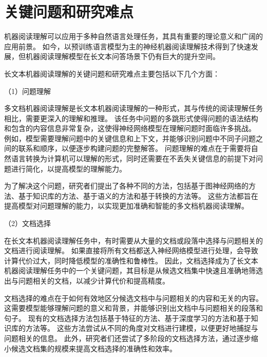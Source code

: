 \section{关键问题和研究难点}
机器阅读理解可以应用于多种自然语言处理任务，其具有重要的理论意义和广阔的应用前景。
如今，以预训练语言模型为主的神经机器阅读理解技术得到了快速发展，但机器阅读理解模型在长文本问答场景下仍有巨大的提升空间。

长文本机器阅读理解的关键问题和研究难点主要包括以下几个方面：

（1）问题理解

多文档机器阅读理解\cite{song2019multi}是长文本机器阅读理解的一种形式，其与传统的阅读理解任务相比，需要更深入的理解和推理。
该任务中问题的多跳形式使得问题的语法结构和包含的内容信息非常复杂，这使得神经网络模型在理解问题时面临许多挑战。
例如，模型需要理解问题中的关键信息和上下文，并能够识别问题中不同子问题之间的联系和顺序，以便逐步构建问题的完整解答。
问题理解的难点在于需要将自然语言转换为计算机可以理解的形式，同时还需要在不丢失关键信息的前提下对问题进行简化，以提高模型的理解能力。

为了解决这个问题，研究者们提出了各种不同的方法，包括基于图神经网络\cite{ding2019cogqa}的方法、基于知识库\cite{Luo2018KnowledgeBQ}的方法、基于语义\cite{zhang2021skeleton}的方法和基于转换\cite{Tu2019MultihopRC}的方法等。
这些方法都旨在提高模型对问题理解的能力，以实现更加准确和智能的多文档机器阅读理解。

（2）文档选择

在长文本机器阅读理解任务中，有时需要从大量的文档或段落中选择与问题相关的文档进行阅读理解。
如果直接将所有文档都送入神经网络模型进行处理，会导致计算代价过大，同时降低模型的准确性和鲁棒性。
因此，文档选择成为了长文本机器阅读理解任务中的一个关键问题，其目标是从候选文档集中快速且准确地筛选出与问题相关的文档，以减少计算代价和提高精度。

文档选择的难点在于如何有效地区分候选文档中与问题相关的内容和无关的内容。
这需要模型能够理解问题的意义和背景，并能够识别出文档中与问题相关的段落和句子。
现有的文档选择方法包括基于特征\cite{Severyn2015LearningTR}的方法、基于深度学习\cite{wu2017sequential}的方法和基于知识库\cite{Luo2018KnowledgeBQ}的方法等。
这些方法尝试从不同的角度对文档进行建模，以便更好地捕捉与问题相关的信息。
此外，研究者们还尝试了多阶段的文档选择\cite{Gan2019MultistepRV}方法，通过逐步缩小候选文档集的规模来提高文档选择的准确性和效率。


